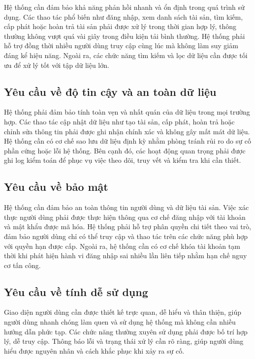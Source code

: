 \documentclass[../DoAn.tex]{subfiles}
\begin{document}
Hệ thống cần đảm bảo khả năng phản hồi nhanh và ổn định trong quá trình sử dụng. Các thao tác phổ biến như đăng nhập, xem danh sách tài sản, tìm kiếm, cấp phát hoặc hoàn trả tài sản phải được xử lý trong thời gian hợp lý, thông thường không vượt quá vài giây trong điều kiện tải bình thường. Hệ thống phải hỗ trợ đồng thời nhiều người dùng truy cập cùng lúc mà không làm suy giảm đáng kể hiệu năng. Ngoài ra, các chức năng tìm kiếm và lọc dữ liệu cần được tối ưu để xử lý tốt với tập dữ liệu lớn.

\subsection{Yêu cầu về độ tin cậy và an toàn dữ liệu}

Hệ thống phải đảm bảo tính toàn vẹn và nhất quán của dữ liệu trong mọi trường hợp. Các thao tác cập nhật dữ liệu như tạo tài sản, cấp phát, hoàn trả hoặc chỉnh sửa thông tin phải được ghi nhận chính xác và không gây mất mát dữ liệu. Hệ thống cần có cơ chế sao lưu dữ liệu định kỳ nhằm phòng tránh rủi ro do sự cố phần cứng hoặc lỗi hệ thống. Bên cạnh đó, các hoạt động quan trọng phải được ghi log kiểm toán để phục vụ việc theo dõi, truy vết và kiểm tra khi cần thiết.

\subsection{Yêu cầu về bảo mật}

Hệ thống cần đảm bảo an toàn thông tin người dùng và dữ liệu tài sản. Việc xác thực người dùng phải được thực hiện thông qua cơ chế đăng nhập với tài khoản và mật khẩu được mã hóa. Hệ thống phải hỗ trợ phân quyền chi tiết theo vai trò, đảm bảo người dùng chỉ có thể truy cập và thao tác trên các chức năng phù hợp với quyền hạn được cấp. Ngoài ra, hệ thống cần có cơ chế khóa tài khoản tạm thời khi phát hiện hành vi đăng nhập sai nhiều lần liên tiếp nhằm hạn chế nguy cơ tấn công.

\subsection{Yêu cầu về tính dễ sử dụng}

Giao diện người dùng cần được thiết kế trực quan, dễ hiểu và thân thiện, giúp người dùng nhanh chóng làm quen và sử dụng hệ thống mà không cần nhiều hướng dẫn phức tạp. Các chức năng thường xuyên sử dụng phải được bố trí hợp lý, dễ truy cập. Thông báo lỗi và trạng thái xử lý cần rõ ràng, giúp người dùng hiểu được nguyên nhân và cách khắc phục khi xảy ra sự cố.
\end{document}
